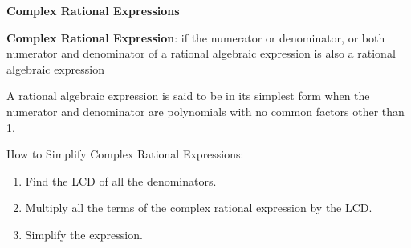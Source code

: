 \begin{center}
\textbf{Complex Rational Expressions 
}
\end{center}

\textbf{Complex Rational Expression}: if the numerator  or denominator, or both numerator and denominator of  a rational algebraic  expression is also a rational  algebraic  expression 

\vspce

A  rational algebraic  expression  is said  to be in its simplest form when the numerator and denominator  are polynomials  with no common  factors other than 1.


\vspce

How to Simplify Complex  Rational Expressions:
\begin{enumerate}[label = \arabic*. ]
\item Find the  LCD of all the denominators.   
\item Multiply all the terms of the complex rational expression by the LCD. 
\item Simplify the expression. 
\end{enumerate}





